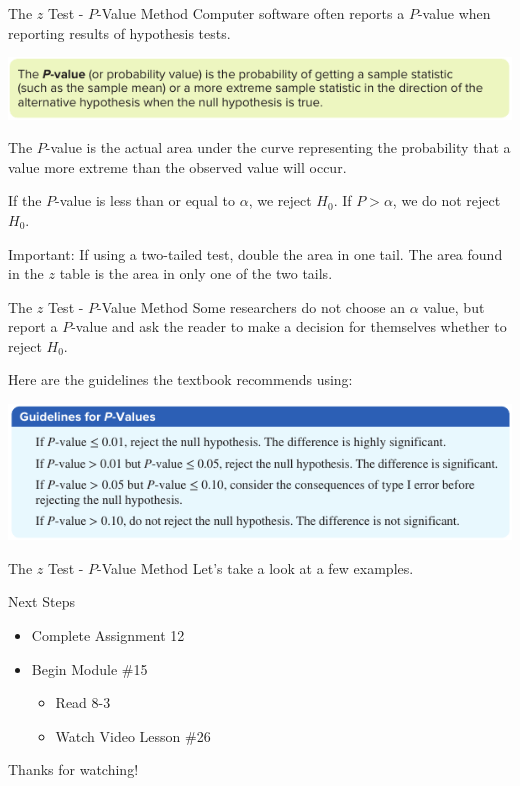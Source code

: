\documentclass[t, aspectratio=169]{beamer}
\newcommand{\?}{\stackrel{?}{=}}
\begin{document}
	\begin{frame}{The $z$ Test - $P$-Value Method}
		Computer software often reports a $P$-value when reporting results of hypothesis tests. \pause
		
		\includegraphics[width=\textwidth]{p-val.png} \pause
		
		The $P$-value is the actual area under the curve representing the probability that a value more extreme than the observed value will occur. \pause
		
		If the $P$-value is less than or equal to $\alpha$, we reject $H_0$. If $P > \alpha$, we do not reject $H_0$. \pause
		
		Important: If using a two-tailed test, double the area in one tail. The area found in the $z$ table is the area in only one of the two tails.
	\end{frame}

	\begin{frame}{The $z$ Test - $P$-Value Method}
		Some researchers do not choose an $\alpha$ value, but report a $P$-value and ask the reader to make a decision for themselves whether to reject $H_0$. \pause
		
		Here are the guidelines the textbook recommends using: \pause
		
		\includegraphics[width=\textwidth]{p-rules.png}
	\end{frame}

	\begin{frame}{The $z$ Test - $P$-Value Method}
		Let's take a look at a few examples.
	\end{frame}

	\begin{frame}{Next Steps}
		\begin{itemize}
			\item Complete Assignment 12
			\item Begin Module \#15 \begin{itemize}
				\item Read 8-3
				\item Watch Video Lesson \#26
			\end{itemize}
		\end{itemize}
	
		\vfill
		
		Thanks for watching!
	\end{frame}
	
\end{document}
